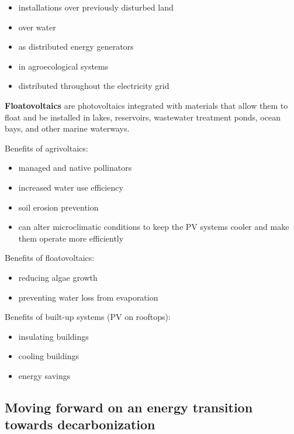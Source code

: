 \begin{itemize}
	\item installations over previously disturbed land
	\item over water
	\item as distributed energy generators
	\item in agroecological systems
	\item distributed throughout the electricity grid
\end{itemize}

\textbf{Floatovoltaics} are photovoltaics integrated with materials that allow
them to float and be installed in lakes, reservoirs, wastewater treatment
ponds, ocean bays, and other marine waterways.

Benefits of agrivoltaics:

\begin{itemize}
	\item managed and native pollinators
	\item increased water use efficiency
	\item soil erosion prevention
	\item can alter microclimatic conditions to keep the PV systems cooler
	and make them operate more efficiently
\end{itemize}

Benefits of floatovoltaics:

\begin{itemize}
	\item reducing algae growth
	\item preventing water loss from evaporation
\end{itemize}

Benefits of built-up systems (PV on rooftops):

\begin{itemize}
	\item insulating buildings
	\item cooling buildings
	\item energy savings
\end{itemize}

\subsection{Moving forward on an energy transition towards decarbonization}


